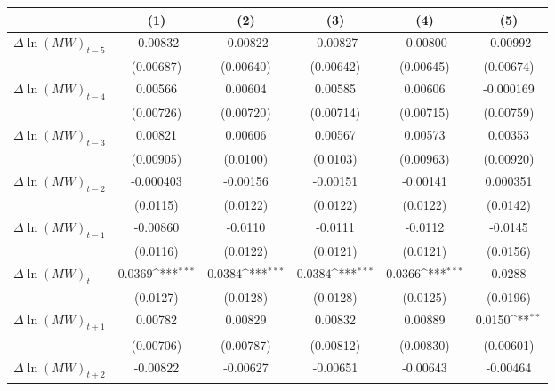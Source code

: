 {
\def\sym#1{\ifmmode^{#1}\else\(^{#1}\)\fi}
\begin{tabular}{l*{5}{c}}
\hline\hline
          &\multicolumn{1}{c}{(1)}         &\multicolumn{1}{c}{(2)}         &\multicolumn{1}{c}{(3)}         &\multicolumn{1}{c}{(4)}         &\multicolumn{1}{c}{(5)}         \\
\hline
$\Delta \ln(MW)_{t-5}$& -0.00832         & -0.00822         & -0.00827         & -0.00800         & -0.00992         \\
          &(0.00687)         &(0.00640)         &(0.00642)         &(0.00645)         &(0.00674)         \\
[1em]
$\Delta \ln(MW)_{t-4}$&  0.00566         &  0.00604         &  0.00585         &  0.00606         &-0.000169         \\
          &(0.00726)         &(0.00720)         &(0.00714)         &(0.00715)         &(0.00759)         \\
[1em]
$\Delta \ln(MW)_{t-3}$&  0.00821         &  0.00606         &  0.00567         &  0.00573         &  0.00353         \\
          &(0.00905)         & (0.0100)         & (0.0103)         &(0.00963)         &(0.00920)         \\
[1em]
$\Delta \ln(MW)_{t-2}$&-0.000403         & -0.00156         & -0.00151         & -0.00141         & 0.000351         \\
          & (0.0115)         & (0.0122)         & (0.0122)         & (0.0122)         & (0.0142)         \\
[1em]
$\Delta \ln(MW)_{t-1}$& -0.00860         &  -0.0110         &  -0.0111         &  -0.0112         &  -0.0145         \\
          & (0.0116)         & (0.0122)         & (0.0121)         & (0.0121)         & (0.0156)         \\
[1em]
$\Delta \ln(MW)_{t}$&   0.0369\sym{***}&   0.0384\sym{***}&   0.0384\sym{***}&   0.0366\sym{***}&   0.0288         \\
          & (0.0127)         & (0.0128)         & (0.0128)         & (0.0125)         & (0.0196)         \\
[1em]
$\Delta \ln(MW)_{t+1}$&  0.00782         &  0.00829         &  0.00832         &  0.00889         &   0.0150\sym{**} \\
          &(0.00706)         &(0.00787)         &(0.00812)         &(0.00830)         &(0.00601)         \\
[1em]
$\Delta \ln(MW)_{t+2}$& -0.00822         & -0.00627         & -0.00651         & -0.00643         & -0.00464         \\

\end{tabular}}
